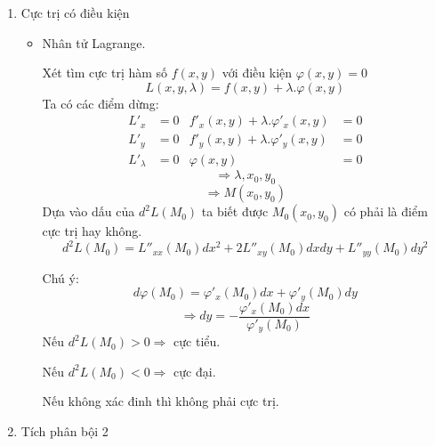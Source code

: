 \documentclass[15pt,a4paper]{report}
\begin{document}
{\begin{center}
\begin{enumerate}
\begin{itemize}
                    Ta xét:
                        \[A = f''_{xx}(x_{0}, y_{0})\]
                        \[B = f''_{xy}(x_{0}, y_{0})\]
                        \[C = f''_{yy}(x_{0}, y_{0})\]
                    \indent Để $M_{0}$ là điểm cực trị của hàm số:
                        \[AC - B^{2} > 0\]
                    Nếu $A > 0$ hoặc $C > 0$ $\Rightarrow$ cực tiểu địa phương.

                    Nếu $A < 0$ hoặc $C < 0$ $\Rightarrow$ cực đại địa phương.
                    
                    Nếu $AC - B^{2} < 0$ $\Rightarrow$ không phải cực trị.

                    Nếu $AC - B^{2} = 0$ $\Rightarrow$ cũng có thể là có, cũng có thể là không.
            
            \end{itemize}
                
        \item Cực trị có điều kiện
            \begin{itemize}
                \item Nhân tử  Lagrange.
                    
                Xét tìm cực trị hàm số $f(x, y)$ với điều kiện $\varphi(x, y) = 0$
                \[L(x, y, \lambda) = f(x, y) + \lambda . \varphi(x, y)\]
                Ta có các điểm dừng:
                \begin{align*}
                L'_{x} &= 0 & f'_{x}(x, y) + \lambda.\varphi'_{x}(x, y) &= 0\\
                L'_{y} &= 0 & f'_{y}(x, y) + \lambda.\varphi'_{y}(x, y) &= 0 \\
                L'_{\lambda} & = 0 & \varphi(x, y) &= 0
            \end{align*}
                \[\Rightarrow \lambda, x_{0}, y_{0}\]
                \[\Rightarrow M(x_{0}, y_{0})\]
                Dựa vào dấu của $d^{2}L(M_{0})$ ta biết được $M_{0}(x_{0}, y_{0})$ có phải là điểm cực trị hay không.
                \[d^{2}L(M_{0}) = L''_{xx}(M_{0})dx^{2} + 2L''_{xy}(M_{0})dxdy + L''_{yy}(M_{0})dy^{2}\]

                Chú ý:
                \[d\varphi(M_{0}) = \varphi'_{x}(M_{0}) dx + \varphi'_{y}(M_{0}) dy\]
                \[\Rightarrow dy = -\dfrac{\varphi'_{x}(M_{0})dx}{\varphi'_{y}(M_{0})}\]
                Nếu $d^{2}L(M_{0}) > 0 \Rightarrow$ cực tiểu.
                
                Nếu $d^{2}L(M_{0}) < 0 \Rightarrow$ cực đại.
                
                Nếu không xác đinh thì không phải cực trị.
            \end{itemize}
        \item Tích phân bội 2
        
            
    \end{enumerate}
    
\end{center}

}
\end{document}
